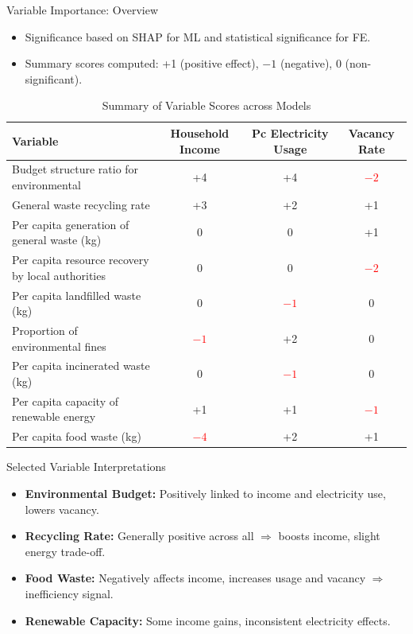 \documentclass{beamer}
\begin{document}
\begin{frame}{Variable Importance: Overview}
    \begin{itemize}
        \item Significance based on SHAP for ML and statistical significance for FE.
        \item Summary scores computed: +1 (positive effect), $-1$ (negative), 0 (non-significant).
    \end{itemize}

\begin{table}[H]
\centering
\tiny
    \begin{tabular}{lccc}
    \toprule
    \textbf{Variable} & \textbf{Household Income} & \textbf{Pc Electricity Usage} & \textbf{Vacancy Rate} \\
    \midrule
    Budget structure ratio for environmental & +4 & +4 & \textcolor{red}{$-2$} \\
    General waste recycling rate             & +3 & +2 & +1 \\
    Per capita generation of general waste (kg) & 0 & 0 & +1 \\
    Per capita resource recovery by local authorities & 0 & 0 & \textcolor{red}{$-2$} \\
    Per capita landfilled waste (kg)         & 0 & \textcolor{red}{$-1$} & 0 \\
    Proportion of environmental fines        & \textcolor{red}{$-1$} & +2 & 0 \\
    Per capita incinerated waste (kg)        & 0 & \textcolor{red}{$-1$} & 0 \\
    Per capita capacity of renewable energy  & +1 & +1 & \textcolor{red}{$-1$} \\
    Per capita food waste (kg)               & \textcolor{red}{$-4$} & +2 & +1 \\
    \bottomrule
    \end{tabular}
\caption{Summary of Variable Scores across Models }
\end{table}
\end{frame}

\begin{frame}{Selected Variable Interpretations}
    \begin{itemize}
        \item \textbf{Environmental Budget:} Positively linked to income and electricity use, lowers vacancy.
        \item \textbf{Recycling Rate:} Generally positive across all $\Rightarrow$ boosts income, slight energy trade-off.
        \item \textbf{Food Waste:} Negatively affects income, increases usage and vacancy $\Rightarrow$ inefficiency signal.
        \item \textbf{Renewable Capacity:} Some income gains, inconsistent electricity effects.
    \end{itemize}
\end{frame}
\end{document}

